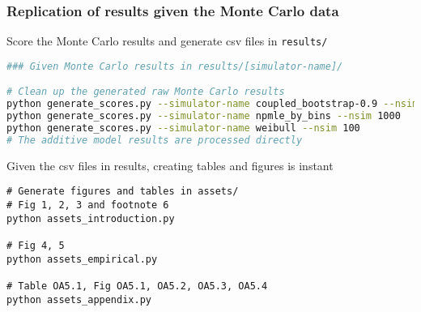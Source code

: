 \documentclass[10pt]{article}
\providecommand{\tightlist}{%
  \setlength{\itemsep}{0pt}\setlength{\parskip}{0pt}}
\begin{document}
\subsubsection*{Replication of results given the Monte Carlo data}

Score the Monte Carlo results and generate csv files in \texttt{results/}
\begin{lstlisting}[language=bash]
### Given Monte Carlo results in results/[simulator-name]/

# Clean up the generated raw Monte Carlo results
python generate_scores.py --simulator-name coupled_bootstrap-0.9 --nsim 1000
python generate_scores.py --simulator-name npmle_by_bins --nsim 1000
python generate_scores.py --simulator-name weibull --nsim 100
# The additive model results are processed directly
\end{lstlisting}


Given the csv files in results, creating tables and figures is instant
\begin{lstlisting}
# Generate figures and tables in assets/
# Fig 1, 2, 3 and footnote 6
python assets_introduction.py

# Fig 4, 5
python assets_empirical.py

# Table OA5.1, Fig OA5.1, OA5.2, OA5.3, OA5.4
python assets_appendix.py
\end{lstlisting}


\end{document}
